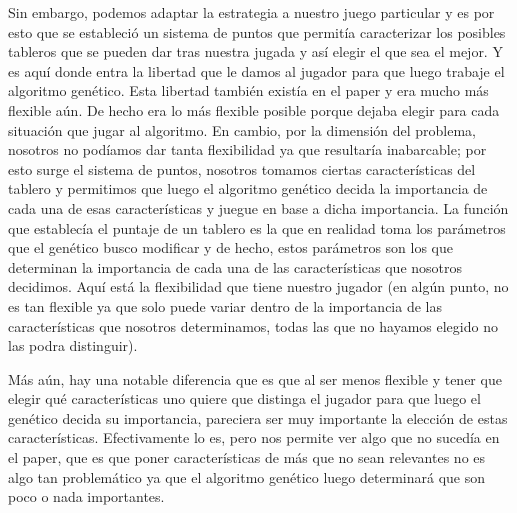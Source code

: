 \documentclass[A4paper,oneside,fleqn,11pt]{article}
\theoremstyle{definition}
\begin{document}
Sin embargo, podemos adaptar la estrategia a nuestro juego particular y es por esto que se estableció un sistema de puntos que permitía caracterizar los posibles tableros que se pueden dar tras nuestra jugada y así elegir el que sea el mejor. Y es aquí donde entra la libertad que le damos al jugador para que luego trabaje el algoritmo genético. Esta libertad también existía en el paper y era mucho más flexible aún. De hecho era lo más flexible posible porque dejaba elegir para cada situación que jugar al algoritmo. En cambio, por la dimensión del problema, nosotros no podíamos dar tanta flexibilidad ya que resultaría inabarcable; por esto surge el sistema de puntos, nosotros tomamos ciertas características del tablero y permitimos que luego el algoritmo genético decida la importancia de cada una de esas características y juegue en base a dicha importancia. La función que establecía el puntaje de un tablero es la que en realidad toma los parámetros que el genético busco modificar y de hecho, estos parámetros son los que determinan la importancia de cada una de las características que nosotros decidimos. Aquí está la flexibilidad que tiene nuestro jugador (en algún punto, no es tan flexible ya que solo puede variar dentro de la importancia de las características que nosotros determinamos, todas las que no hayamos elegido no las podra distinguir).

Más aún, hay una notable diferencia que es que al ser menos flexible y tener que elegir qué características uno quiere que distinga el jugador para que luego el genético decida su importancia, pareciera ser muy importante la elección de estas características. Efectivamente lo es, pero nos permite ver algo que no sucedía en el paper, que es que poner características de más que no sean relevantes no es algo tan problemático ya que el algoritmo genético luego determinará que son poco o nada importantes. 
\end{document}
